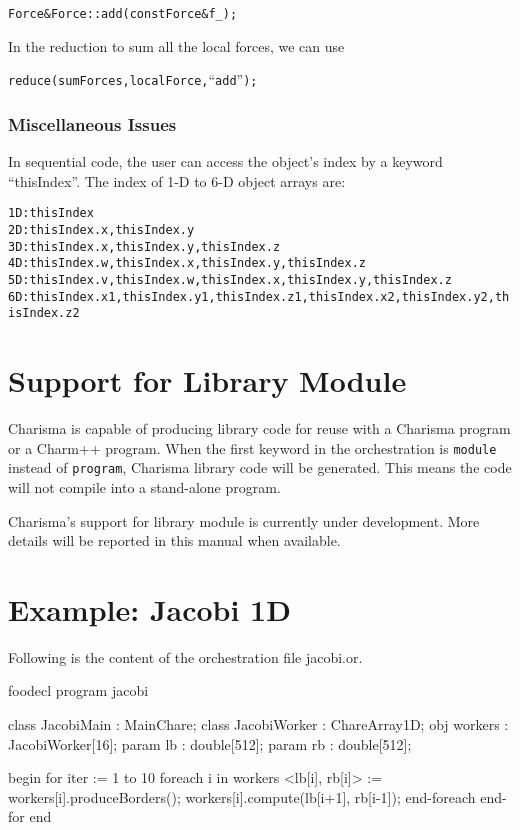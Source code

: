 \documentclass[10pt]{article}
\def\smallfbox#1{{\small \fbox{#1}}}
\def\code#1{{\small {\tt {#1}}}}
\begin{document}
\begin{alltt}
    Force& Force::add(const Force& f_);
\end{alltt}

In the reduction to sum all the local forces, we can use

\begin{alltt}
    reduce(sumForces, localForce, ``add'');
\end{alltt}

\subsubsection{Miscellaneous Issues}
In sequential code, the user can access the object's index by a keyword 
``thisIndex''. The index of 1-D to 6-D object arrays are:

\begin{alltt}
1D: thisIndex
2D: thisIndex.x, thisIndex.y
3D: thisIndex.x, thisIndex.y, thisIndex.z
4D: thisIndex.w, thisIndex.x, thisIndex.y, thisIndex.z
5D: thisIndex.v, thisIndex.w, thisIndex.x, thisIndex.y, thisIndex.z
6D: thisIndex.x1, thisIndex.y1, thisIndex.z1, thisIndex.x2, thisIndex.y2, thisIndex.z2
\end{alltt}

\section{Support for Library Module}
\label{sec:module}

Charisma is capable of producing library code for reuse with a Charisma program
or a Charm++ program. When the first keyword in the orchestration is
\code{module} instead of \code{program}, Charisma library code will be
generated. This means the code will not compile into a stand-alone program.

Charisma's support for library module is currently under development. More
details will be reported in this manual when available.

\appendix
\label{sec:appendix}

\section{Example: Jacobi 1D}
Following is the content of the orchestration file jacobi.or. 

\begin{SaveVerbatim}{foodecl}
program jacobi

class  JacobiMain : MainChare;
class  JacobiWorker : ChareArray1D;
obj  workers : JacobiWorker[16];
param  lb : double[512];
param  rb : double[512];

begin
    for iter := 1 to 10
	foreach i in workers
	    <lb[i], rb[i]> := workers[i].produceBorders();
	    workers[i].compute(lb[i+1], rb[i-1]);
	end-foreach
    end-for
end
\end{SaveVerbatim}
\vspace{0.1in}
\smallfbox{\BUseVerbatim{foodecl}}
\vspace{0.1in}
\end{document}

